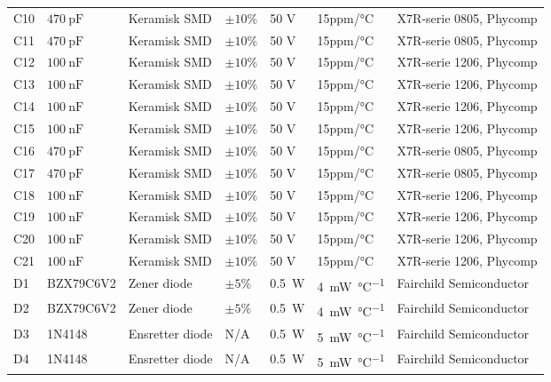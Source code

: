 \begin{table}[h!]
\begin{threeparttable}
\begin{tabular}{ l l l l l l l }
C10 & $\SI{470}{\pico\farad}$ & Keramisk SMD & $\pm 10\%$ & 50 \si{\volt} & 15ppm/\si{\celsius} & X7R-serie 0805, Phycomp \\
C11 & $\SI{470}{\pico\farad}$ & Keramisk SMD & $\pm 10\%$ & 50 \si{\volt} & 15ppm/\si{\celsius} & X7R-serie 0805, Phycomp \\
C12 & $\SI{100}{\nano\farad}$ & Keramisk SMD & $\pm 10\%$ & 50 \si{\volt} & 15ppm/\si{\celsius} & X7R-serie 1206, Phycomp \\
C13 & $\SI{100}{\nano\farad}$ & Keramisk SMD & $\pm 10\%$ & 50 \si{\volt} & 15ppm/\si{\celsius} & X7R-serie 1206, Phycomp \\
C14 & $\SI{100}{\nano\farad}$ & Keramisk SMD & $\pm 10\%$ & 50 \si{\volt} & 15ppm/\si{\celsius} & X7R-serie 1206, Phycomp \\
C15 & $\SI{100}{\nano\farad}$ & Keramisk SMD & $\pm 10\%$ & 50 \si{\volt} & 15ppm/\si{\celsius} & X7R-serie 1206, Phycomp \\
C16 & $\SI{470}{\pico\farad}$ & Keramisk SMD & $\pm 10\%$ & 50 \si{\volt} & 15ppm/\si{\celsius} & X7R-serie 0805, Phycomp \\
C17 & $\SI{470}{\pico\farad}$ & Keramisk SMD & $\pm 10\%$ & 50 \si{\volt} & 15ppm/\si{\celsius} & X7R-serie 0805, Phycomp \\
C18 & $\SI{100}{\nano\farad}$ & Keramisk SMD & $\pm 10\%$ & 50 \si{\volt} & 15ppm/\si{\celsius} & X7R-serie 1206, Phycomp \\
C19 & $\SI{100}{\nano\farad}$ & Keramisk SMD & $\pm 10\%$ & 50 \si{\volt} & 15ppm/\si{\celsius} & X7R-serie 1206, Phycomp \\
C20 & $\SI{100}{\nano\farad}$ & Keramisk SMD & $\pm 10\%$ & 50 \si{\volt} & 15ppm/\si{\celsius} & X7R-serie 1206, Phycomp \\
C21 & $\SI{100}{\nano\farad}$ & Keramisk SMD & $\pm 10\%$ & 50 \si{\volt} & 15ppm/\si{\celsius} & X7R-serie 1206, Phycomp \\
D1 & BZX79C6V2 & Zener diode & $\pm 5 \%$ & \SI{0.5}{\watt} & \SI{4}{\milli\watt\per\celsius} & Fairchild Semiconductor \\
D2 & BZX79C6V2 & Zener diode & $\pm 5 \%$ & \SI{0.5}{\watt} & \SI{4}{\milli\watt\per\celsius} & Fairchild Semiconductor \\
D3 & 1N4148 & Ensretter diode & N/A & \SI{0.5}{\watt} & \SI{5}{\milli\watt\per\celsius} & Fairchild Semiconductor \\
D4 & 1N4148 & Ensretter diode & N/A & \SI{0.5}{\watt} & \SI{5}{\milli\watt\per\celsius} & Fairchild Semiconductor \\

\end{tabular}
\end{threeparttable}
\end{table}
